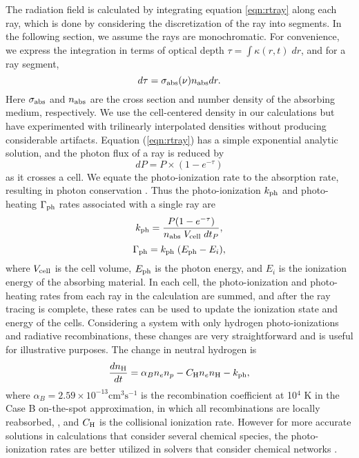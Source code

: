 \documentclass[apj,onecolumn]{emulateapj}
\begin{document}
The radiation field is calculated by integrating equation
\ref{eqn:rtray} along each ray, which is done by considering the
discretization of the ray into segments.  In the following section, we
assume the rays are monochromatic.  For convenience, we express the
integration in terms of optical depth $\tau = \int \kappa(r,t) \;
dr$, and for a ray segment,
%
\begin{equation}
  \label{eqn:dtau}
  d\tau = \sigma_{\rm abs}(\nu) n_{\rm abs} dr.
\end{equation}
Here $\sigma_{\rm abs}$ and $n_{\rm abs}$ are the cross section and
number density of the absorbing medium, respectively.  We use the
cell-centered density in our calculations but have experimented with
trilinearly interpolated densities \citep[see][]{Mellema06} without
producing considerable artifacts.  Equation (\ref{eqn:rtray}) has a
simple exponential analytic solution, and the photon flux of a ray is
reduced by
%
\begin{equation}
  \label{eqn:flux}
  dP = P \times (1 - e^{-\tau})
\end{equation}
as it crosses a cell.  We equate the photo-ionization rate to the
absorption rate, resulting in photon conservation \citep{Abel99_RT,
  Mellema06}.  Thus the photo-ionization $k_{\rm ph}$ and
photo-heating $\Gamma_{\rm ph}$ rates associated with a single ray are
%
\begin{equation}
  \label{eqn:kph}
  k_{\rm ph} = \frac{P (1 - e^{-\tau})}{n_{\rm abs} \; V_{\rm cell} \; dt_P},
\end{equation}
\begin{equation}
  \label{eqn:gamma}
  \Gamma_{\rm ph} = k_{\rm ph} \; (E_{\rm ph} - E_i),
\end{equation}
where $V_{\rm cell}$ is the cell volume, $E_{\rm ph}$ is the photon
energy, and $E_i$ is the ionization energy of the absorbing material.
In each cell, the photo-ionization and photo-heating rates from each
ray in the calculation are summed, and after the ray tracing is
complete, these rates can be used to update the ionization state and
energy of the cells.  Considering a system with only hydrogen
photo-ionizations and radiative recombinations, these changes are very
straightforward and is useful for illustrative purposes.  The change
in neutral hydrogen is
%
\begin{equation}
\frac{dn_{\rm H}}{dt} = \alpha_B n_e n_p - C_{\rm H} n_e n_{\rm
  H} - k_{\rm ph},
\end{equation}
where $\alpha_B = 2.59 \times 10^{-13} \mathrm{cm}^3 \mathrm{s}^{-1}$
is the recombination coefficient at 10$^4$ K in the Case B on-the-spot
approximation, in which all recombinations are locally reabsorbed,
\citep{Spitzer78}, and $C_{\rm H}$ is the collisional ionization rate.
However for more accurate solutions in calculations that consider
several chemical species, the photo-ionization rates are better
utilized in solvers that consider chemical networks
\citep[e.g.][]{Abel97}.
\end{document}
